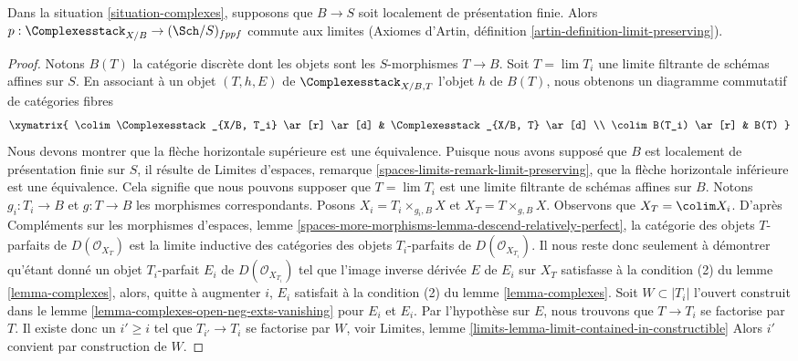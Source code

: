\begin{lemma}
\label{lemma-complexes-limits}
Dans la situation \ref{situation-complexes}, supposons que $B \to S$ soit
localement de présentation finie. Alors
$p : \Complexesstack_{X/B} \to (\Sch/S)_{fppf}$ commute aux limites
(Axiomes d'Artin, définition \ref{artin-definition-limit-preserving}).
\end{lemma}

\begin{proof}
Notons $B(T)$ la catégorie discrète dont les objets sont les $S$-morphismes
$T \to B$. Soit $T = \lim T_i$ une limite filtrante de schémas affines sur
$S$. En associant à un objet $(T, h, E)$ de $\Complexesstack_{X/B, T}$ l'objet
$h$ de $B(T)$, nous obtenons un diagramme commutatif de catégories fibres
$$
\xymatrix{
\colim \Complexesstack_{X/B, T_i} \ar[r] \ar[d] &
\Complexesstack_{X/B, T} \ar[d] \\
\colim B(T_i) \ar[r] & B(T)
}
$$
Nous devons montrer que la flèche horizontale supérieure est une équivalence.
Puisque nous avons supposé que $B$ est localement de présentation finie sur
$S$, il résulte de
Limites d'espaces, remarque \ref{spaces-limits-remark-limit-preserving},
que la flèche horizontale inférieure est une équivalence. Cela signifie que
nous pouvons supposer que $T = \lim T_i$ est une limite filtrante de schémas
affines sur $B$. Notons $g_i : T_i \to B$ et $g : T \to B$ les morphismes
correspondants. Posons $X_i = T_i \times_{g_i, B} X$ et
$X_T = T \times_{g, B} X$.
Observons que $X_T = \colim X_i$.
D'après Compléments sur les morphismes d'espaces, lemme
\ref{spaces-more-morphisms-lemma-descend-relatively-perfect},
la catégorie des objets $T$-parfaits de $D(\mathcal{O}_{X_T})$ est la limite
inductive des catégories des objets $T_i$-parfaits de
$D(\mathcal{O}_{X_{T_i}})$.
Il nous reste donc seulement à démontrer qu'étant donné un objet $T_i$-parfait
$E_i$ de $D(\mathcal{O}_{X_{T_i}})$ tel que l'image inverse dérivée $E$ de
$E_i$ sur $X_T$ satisfasse à la condition (2) du lemme
\ref{lemma-complexes}, alors, quitte à augmenter $i$, $E_i$ satisfait à la
condition (2) du lemme \ref{lemma-complexes}.
Soit $W \subset |T_i|$ l'ouvert construit dans le
lemme \ref{lemma-complexes-open-neg-exts-vanishing} pour $E_i$ et $E_i$.
Par l'hypothèse sur $E$, nous trouvons que $T \to T_i$ se factorise par $T$.
Il existe donc un $i' \geq i$ tel que $T_{i'} \to T_i$ se factorise par $W$,
voir Limites, lemme
\ref{limits-lemma-limit-contained-in-constructible}
Alors $i'$ convient par construction de $W$.
\end{proof}

